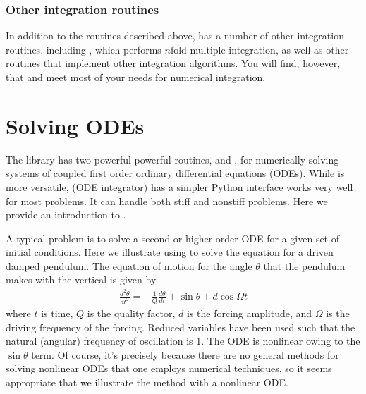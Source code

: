 \documentclass[letterpaper,10pt,english]{sphinxmanual}
\begin{document}
\subsubsection{Other integration routines}
\label{\detokenize{chap9/chap9_scipy:other-integration-routines}}
\sphinxAtStartPar
In addition to the routines described above,  has a number of other integration routines, including , which performs \(n\)\sphinxhyphen{}fold multiple integration, as well as other routines that implement other integration algorithms.  You will find, however, that  and  meet most of your needs for numerical integration.

\ignorespaces 

\section{Solving ODEs}
\label{\detokenize{chap9/chap9_scipy:solving-odes}}\label{\detokenize{chap9/chap9_scipy:index-4}}
\sphinxAtStartPar
The  library has two powerful powerful routines,  and , for numerically solving systems of coupled first order ordinary differential equations (ODEs).  While  is more versatile,  (ODE integrator) has a simpler Python interface works very well for most problems.  It can handle both stiff and non\sphinxhyphen{}stiff problems.  Here we provide an introduction to .

\sphinxAtStartPar
A typical problem is to solve a second or higher order ODE for a given set of initial conditions.  Here we illustrate using  to solve the equation for a driven damped pendulum.  The equation of motion for the angle \(\theta\) that the pendulum makes with the vertical is given by
\begin{equation*}
\begin{split}\frac{d^2\theta}{dt^2} = -\frac{1}{Q} \frac{d\theta}{dt} +
                          \sin\theta + d \cos\Omega t\end{split}
\end{equation*}
\sphinxAtStartPar
where \(t\) is time, \(Q\) is the quality factor, \(d\) is the forcing amplitude, and \(\Omega\) is the driving frequency of the forcing.  Reduced variables have been used such that the natural (angular) frequency of oscillation is 1.  The ODE is nonlinear owing to the \(\sin\theta\) term.  Of course, it’s precisely because there are no general methods for solving nonlinear ODEs that one employs numerical techniques, so it seems appropriate that we illustrate the method with a nonlinear ODE.
\end{document}
